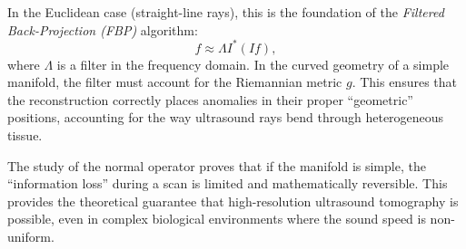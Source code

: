 In the Euclidean case (straight-line rays), this is the foundation of the \emph{Filtered Back-Projection (FBP)} algorithm:
\[%
  f \approx \Lambda I^* (I f)
,\]%
where $\Lambda$ is a filter in the frequency domain. In the curved geometry of a simple manifold, the filter must account for the Riemannian metric $g$. This ensures that the reconstruction correctly places anomalies in their proper ``geometric'' positions, accounting for the way ultrasound rays bend through heterogeneous tissue.

The study of the normal operator proves that if the manifold is simple, the ``information loss'' during a scan is limited and mathematically reversible. This provides the theoretical guarantee that high-resolution ultrasound tomography is possible, even in complex biological environments where the sound speed is non-uniform.
